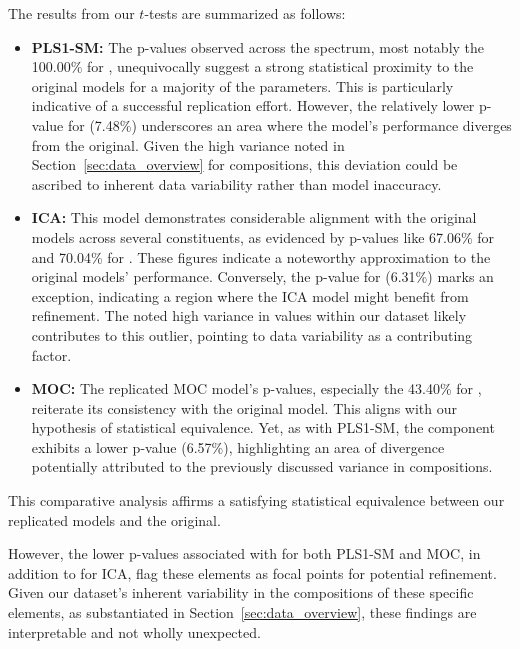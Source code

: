 The results from our $t$-tests are summarized as follows:

\begin{itemize}
    \item \textbf{PLS1-SM:} The p-values observed across the spectrum, most notably the 100.00\% for , unequivocally suggest a strong statistical proximity to the original models for a majority of the parameters. This is particularly indicative of a successful replication effort. However, the relatively lower p-value for  (7.48\%) underscores an area where the model's performance diverges from the original. Given the high variance noted in Section~\ref{sec:data_overview} for  compositions, this deviation could be ascribed to inherent data variability rather than model inaccuracy.

    \item \textbf{ICA:} This model demonstrates considerable alignment with the original models across several constituents, as evidenced by p-values like 67.06\% for  and 70.04\% for . These figures indicate a noteworthy approximation to the original models' performance. Conversely, the p-value for  (6.31\%) marks an exception, indicating a region where the ICA model might benefit from refinement. The noted high variance in  values within our dataset likely contributes to this outlier, pointing to data variability as a contributing factor.

    \item \textbf{MOC:} The replicated MOC model's p-values, especially the 43.40\% for , reiterate its consistency with the original model. This aligns with our hypothesis of statistical equivalence. Yet, as with PLS1-SM, the  component exhibits a lower p-value (6.57\%), highlighting an area of divergence potentially attributed to the previously discussed variance in  compositions.
\end{itemize}

This comparative analysis affirms a satisfying statistical equivalence between our replicated models and the original.

However, the lower p-values associated with  for both PLS1-SM and MOC, in addition to  for ICA, flag these elements as focal points for potential refinement.
Given our dataset's inherent variability in the compositions of these specific elements, as substantiated in Section~\ref{sec:data_overview}, these findings are interpretable and not wholly unexpected.

